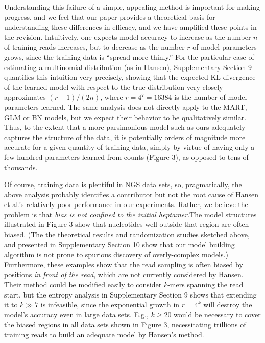 \documentclass{article}
\begin{document}
Understanding this failure of a simple, appealing method is important for making
progress, and we feel that our paper provides a theoretical basis for
understanding these differences in efficacy, and we have amplified these points
in the revision.  Intuitively, one expects model accuracy to increase as the
number $n$ of training reads increases, but to decrease as the number $r$ of
model parameters grows, since the training data is ``spread more thinly.''  For
the particular case of estimating a multinomial distribution (as in Hansen),
Supplementary Section 9 quantifies this intuition very precisely, showing that
the expected KL divergence of the learned model with respect to the true
distribution very closely approximates $(r-1)/(2n)$, where $r=4^7=16384$ is the
number of model parameters learned.  The same analysis does not directly apply
to the MART, GLM or BN models, but we expect their behavior to be qualitatively
similar.  Thus, to the extent that a more parsimonious model such as ours
adequately captures the structure of the data, it is potentially orders of
magnitude more accurate for a given quantity of training data, simply by virtue
of having only a few hundred parameters learned from counts (Figure 3), as
opposed to tens of thousands.  

Of course, training data is plentiful in NGS data sets, so, pragmatically, the
above analysis probably identifies a contributor but not the root cause of
Hansen et al.'s relatively poor performance in our experiments. Rather, we
believe the problem is that \emph{bias is not confined to the initial
heptamer}.The model structures illustrated in Figure 3 show that nucleotides
well outside that region are often biased.  (The the theoretical results and
randomization studies sketched above, and presented in Supplementary Section 10
show that our model building algorithm is not prone to spurious discovery of
overly-complex models.)  Furthermore, these examples show that the read sampling
is often biased by positions \emph{in front of the read}, which are not
currently considered by Hansen.  Their method could be modified easily to
consider $k$-mers spanning the read start, but the entropy analysis in
Supplementary Section 9 shows that extending it to $k \gg 7$ is infeasible,
since the exponential growth in $r=4^k$ will destroy the model's accuracy even
in large data sets. E.g., $k \ge 20$ would be necessary to cover the biased
regions in all data sets shown in Figure 3, necessitating trillions of training
reads to build an adequate model by Hansen's method.
\end{document}
